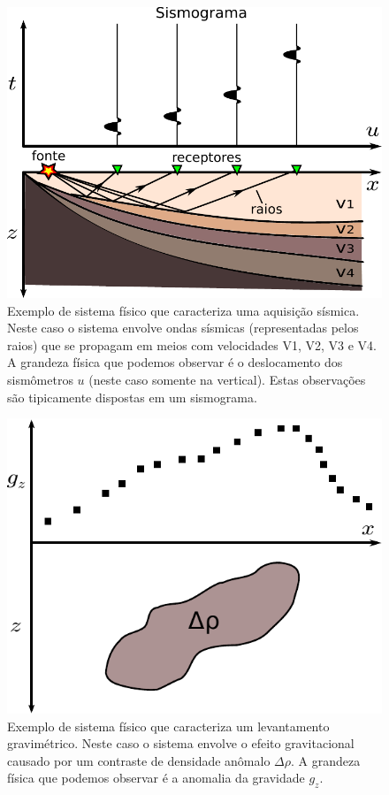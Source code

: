 \begin{figure}[b]
    \centering
    \includegraphics[scale=0.7]{figs/system-seismic}
    \caption{Exemplo de sistema físico que caracteriza uma aquisição sísmica.
        Neste caso o sistema envolve ondas sísmicas (representadas pelos raios)
        que se propagam em meios com velocidades V1, V2, V3 e V4.
        A grandeza física que podemos observar
        é o deslocamento dos sismômetros $u$ (neste caso somente na vertical).
        Estas observações são tipicamente dispostas em um sismograma.}
    \label{fig:system-seismic}
\end{figure}

\begin{figure}
    \centering
    \includegraphics[scale=0.7]{figs/system-grav}
    \caption{Exemplo de sistema físico que caracteriza um levantamento
        gravimétrico. Neste caso o sistema envolve o efeito gravitacional
        causado por um contraste de densidade anômalo $\Delta\rho$.
        A grandeza física que podemos observar é a anomalia da
        gravidade $g_z$.}
    \label{fig:system-grav}
\end{figure}

